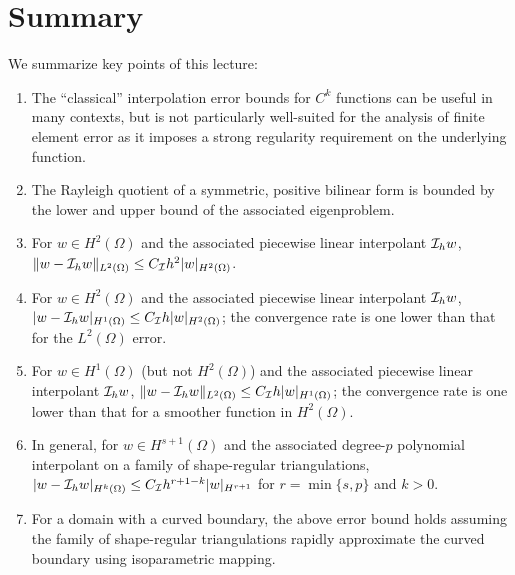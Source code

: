 \section{Summary}
We summarize key points of this lecture:
\begin{enumerate}
\item The ``classical'' interpolation error bounds for $C^k$ functions can be useful in many contexts, but is not particularly well-suited for the analysis of finite element error as it imposes a strong regularity requirement on the underlying function.
\item The Rayleigh quotient of a symmetric, positive bilinear form is bounded by the lower and upper bound of the associated eigenproblem.
\item For $w \in H^2(\Omega)$ and the associated piecewise linear interpolant $\mathcal{I}_h w$, $\| w - \mathcal{I}_h w \|_{L^2(\Omega)} \leq C_{\mathcal{I}} h^2 | w |_{H^2(\Omega)}$.
\item For $w \in H^2(\Omega)$ and the associated piecewise linear interpolant $\mathcal{I}_h w$, $| w - \mathcal{I}_h w |_{H^1(\Omega)} \leq C_{\mathcal{I}} h | w |_{H^2(\Omega)}$; the convergence rate is one lower than that for the $L^2(\Omega)$ error.
\item For $w \in H^1(\Omega)$ (but not $H^2(\Omega)$) and the associated piecewise linear interpolant $\mathcal{I}_h w$,  $\| w - \mathcal{I}_h w \|_{L^2(\Omega)} \leq C_{\mathcal{I}} h | w |_{H^1(\Omega)}$; the convergence rate is one lower than that for a smoother function in $H^2(\Omega)$.
\item In general, for $w \in H^{s+1}(\Omega)$ and the associated degree-$p$ polynomial interpolant on a family of shape-regular triangulations,  $|w - \mathcal{I}_h w|_{H^k(\Omega)} \leq C_{\mathcal{I}} h^{r+1-k}|w|_{H^{r+1}}$ for $r = \min\{s,p\}$ and $k > 0$.
\item For a domain with a curved boundary, the above error bound holds assuming the family of shape-regular triangulations rapidly approximate the curved boundary using isoparametric mapping.
\end{enumerate}
